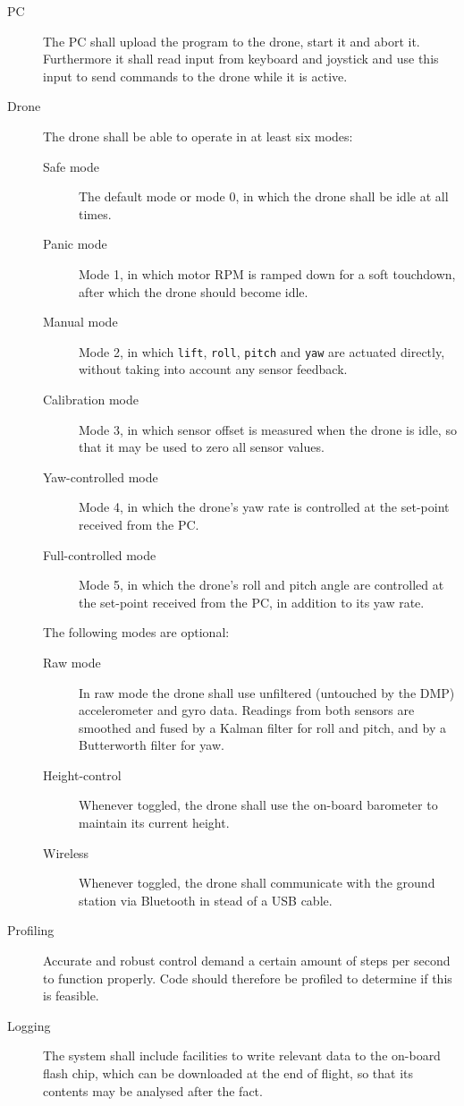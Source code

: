 \documentclass[final]{article}
\begin{document}
\begin{description}
	\item[PC] The PC shall upload the program to the drone, start it and abort it. Furthermore it shall read input from keyboard and joystick and use this input to send commands to the drone while it is active.
	\item[Drone] The drone shall be able to operate in at least six modes:
	\begin{description}
		\item[Safe mode] The default mode or mode 0, in which the drone shall be idle at all times.
		\item[Panic mode] Mode 1, in which motor RPM is ramped down for a soft touchdown, after which the drone should become idle.
		\item[Manual mode] Mode 2, in which \texttt{lift}, \texttt{roll}, \texttt{pitch} and \texttt{yaw} are actuated directly, without taking into account any sensor feedback.
		\item[Calibration mode] Mode 3, in which sensor offset is measured when the drone is idle, so that it may be used to zero all sensor values.
		\item[Yaw-controlled mode] Mode 4, in which the drone's yaw rate is controlled at the set-point received from the PC.
		\item[Full-controlled mode] Mode 5, in which the drone's roll and pitch angle are controlled at the set-point received from the PC, in addition to its yaw rate.
	\end{description}
	The following modes are optional:
	\begin{description}
		\item[Raw mode] In raw mode the drone shall use unfiltered (untouched by the DMP) accelerometer and gyro data. Readings from both sensors are smoothed and fused by a Kalman filter for roll and pitch, and by a Butterworth filter for yaw.
		\item[Height-control] Whenever toggled, the drone shall use the on-board barometer to maintain its current height.
		\item[Wireless] Whenever toggled, the drone shall communicate with the ground station via Bluetooth in stead of a USB cable.
	\end{description}
	\item[Profiling] Accurate and robust control demand a certain amount of steps per second to function properly. Code should therefore be profiled to determine if this is feasible.
	\item[Logging] The system shall include facilities to write relevant data to the on-board flash chip, which can be downloaded at the end of flight, so that its contents may be analysed after the fact.
\end{description}
\end{document}
